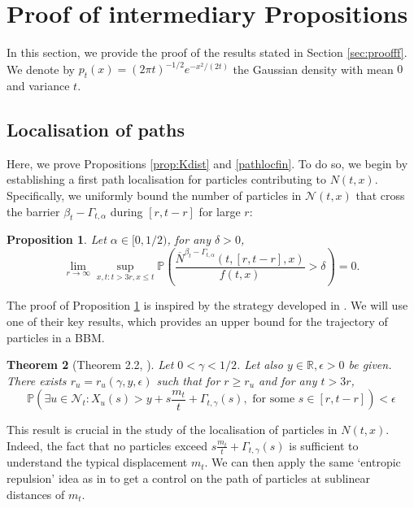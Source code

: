 \documentclass{article}
\newtheorem{theorem}{Theorem}[section]
\newtheorem{proposition}[theorem]{Proposition}
\newcommand{\NOB}[2]{\overline{N}^{#1}(#2)}
\newcommand{\Prob}{\mathbb{P}}
\begin{document}
\section{Proof of intermediary Propositions}\label{Sec:proofprop}

In this section, we provide the proof of the results stated in Section \ref{sec:proofff}. We denote by \( p_t(x) = (2\pi t)^{-1/2} e^{-x^2/(2t)} \) the Gaussian density with mean \(0\) and variance \(t\).

\subsection{Localisation of paths}\label{subSec:proofprop1}
Here, we prove Propositions \ref{prop:Kdist} and \ref{pathlocfin}. To do so, we begin by establishing a first path localisation for particles contributing to $N(t,x)$. Specifically, we uniformly bound the number of particles in $\mathcal{N}(t,x)$ that cross the barrier $\beta_t - \Gamma_{t,\alpha}$ during $ [r, t-r]$ for large $r$:

\begin{proposition}\label{pathlocup_proba}
    Let $\alpha\in [0,1/2)$, for any $\delta>0$,
\begin{equation}
    \lim_{r\to \infty}\sup_{x,t: t>3r,  x\leq t}\Prob\left( \frac{\NOB{\beta_t -\Gamma_{t,\alpha}}{t,[r,t-r],x}}{f(t,x)}  >\delta \right) =0.
\end{equation}
\end{proposition}

The proof of Proposition \ref{pathlocup_proba} is inspired by the strategy developed in \cite{Arguin2016}. We will use one of their key results, which provides an upper bound for the trajectory of particles in a BBM.
\begin{theorem}[Theorem 2.2, \cite{Arguin2016}]\label{envsuparguin}
    Let $0 < \gamma < 1/2$. Let also $y \in \mathbb{R}, \epsilon > 0$ be given. There
exists $r_u = r_u(\gamma, y, \epsilon)$ such that for $r \geq r_u$ and for any $t > 3r$,
\begin{equation}
    \Prob\left(\exists u \in \mathcal{N}_t: X_u(s) > y + s\frac{m_t}{t}+\Gamma_{t,\gamma}(s), \text{ for some } s \in [r, t - r]\right)< \epsilon
\end{equation}
\end{theorem}

This result is crucial in the study of the localisation of particles in $N(t,x)$. Indeed, the fact that no particles exceed $ s\frac{m_t}{t}+\Gamma_{t,\gamma}(s)$ is sufficient to understand the typical displacement $m_t$. We can then apply the same `entropic repulsion' idea as in \cite{Arguin2016} to get a control on the path of particles at sublinear distances of $m_t$.
\end{document}
